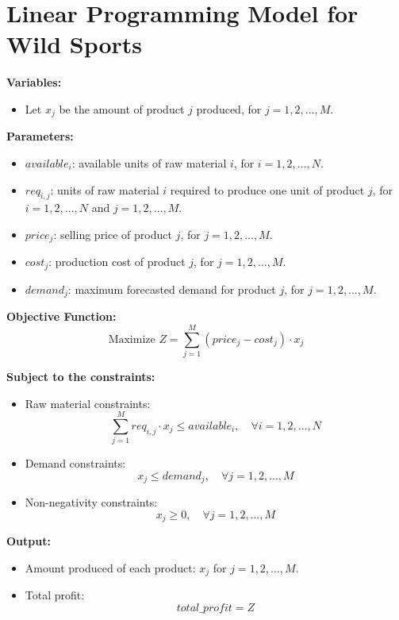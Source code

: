 \documentclass{article}
\begin{document}
\section*{Linear Programming Model for Wild Sports}

\textbf{Variables:}
\begin{itemize}
    \item Let $x_j$ be the amount of product $j$ produced, for $j = 1, 2, \ldots, M$.
\end{itemize}

\textbf{Parameters:}
\begin{itemize}
    \item $available_i$: available units of raw material $i$, for $i = 1, 2, \ldots, N$.
    \item $req_{i,j}$: units of raw material $i$ required to produce one unit of product $j$, for $i = 1, 2, \ldots, N$ and $j = 1, 2, \ldots, M$.
    \item $price_j$: selling price of product $j$, for $j = 1, 2, \ldots, M$.
    \item $cost_j$: production cost of product $j$, for $j = 1, 2, \ldots, M$.
    \item $demand_j$: maximum forecasted demand for product $j$, for $j = 1, 2, \ldots, M$.
\end{itemize}

\textbf{Objective Function:}
\[
\text{Maximize } Z = \sum_{j=1}^{M} (price_j - cost_j) \cdot x_j
\]

\textbf{Subject to the constraints:}
\begin{itemize}
    \item Raw material constraints:
    \[
    \sum_{j=1}^{M} req_{i,j} \cdot x_j \leq available_i, \quad \forall i = 1, 2, \ldots, N
    \]
    \item Demand constraints:
    \[
    x_j \leq demand_j, \quad \forall j = 1, 2, \ldots, M
    \]
    \item Non-negativity constraints:
    \[
    x_j \geq 0, \quad \forall j = 1, 2, \ldots, M
    \]
\end{itemize}

\textbf{Output:}
\begin{itemize}
    \item Amount produced of each product: $x_j$ for $j = 1, 2, \ldots, M$.
    \item Total profit: 
    \[
    total\_profit = Z
    \]
\end{itemize}
\end{document}
